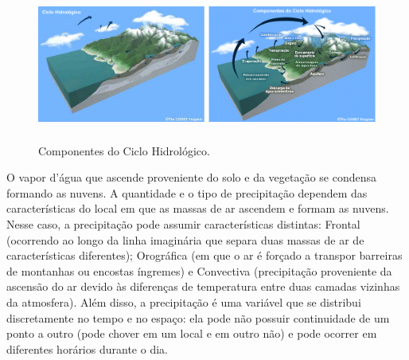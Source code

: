 \begin{figure}
\centering
\includegraphics[height=5cm]{./figs/fig01.png}
\caption{Componentes do Ciclo Hidrológico.}
\label{fig01}
\end{figure}

O vapor d'água que ascende proveniente do solo e da vegetação se condensa formando as nuvens. A quantidade e o tipo de precipitação dependem das características do local em que as massas de ar ascendem e formam as nuvens. Nesse caso, a precipitação pode assumir características distintas: Frontal (ocorrendo ao longo da linha imaginária que separa duas massas de ar de características diferentes); Orográfica (em que o ar é forçado a transpor barreiras de montanhas ou encostas íngremes) e Convectiva (precipitação proveniente da ascensão do ar devido às diferenças de temperatura entre duas camadas vizinhas da atmosfera). Além disso, a precipitação é uma variável que se distribui discretamente no tempo e no espaço: ela pode não possuir continuidade de um ponto a outro (pode chover em um local e em outro não) e pode ocorrer em diferentes horários durante o dia.

